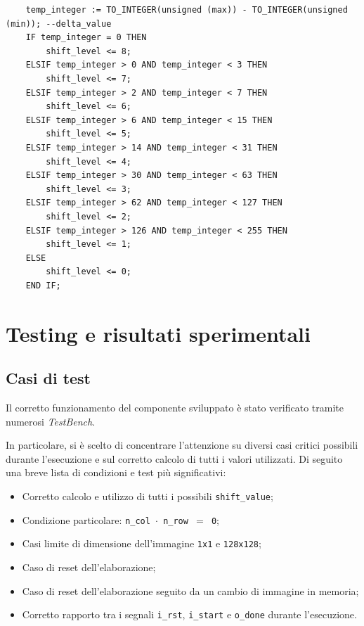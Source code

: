 \documentclass{article}
\begin{document}
\begin{verbatim}
    temp_integer := TO_INTEGER(unsigned (max)) - TO_INTEGER(unsigned (min)); --delta_value
    IF temp_integer = 0 THEN
        shift_level <= 8;
    ELSIF temp_integer > 0 AND temp_integer < 3 THEN
        shift_level <= 7;
    ELSIF temp_integer > 2 AND temp_integer < 7 THEN
        shift_level <= 6;
    ELSIF temp_integer > 6 AND temp_integer < 15 THEN
        shift_level <= 5;
    ELSIF temp_integer > 14 AND temp_integer < 31 THEN
        shift_level <= 4;
    ELSIF temp_integer > 30 AND temp_integer < 63 THEN
        shift_level <= 3;
    ELSIF temp_integer > 62 AND temp_integer < 127 THEN
        shift_level <= 2;
    ELSIF temp_integer > 126 AND temp_integer < 255 THEN
        shift_level <= 1;
    ELSE
        shift_level <= 0;
    END IF;
\end{verbatim}

\vspace{1cm}
\section{Testing e risultati sperimentali} %
\subsection{Casi di test} %
Il corretto funzionamento del componente sviluppato è stato verificato tramite numerosi \emph{TestBench}.\par In particolare, si è scelto di concentrare l’attenzione su diversi casi critici possibili durante l’esecuzione e sul corretto calcolo di tutti i valori utilizzati. Di seguito una breve lista di condizioni e test più significativi:

\begin{itemize}
    \item   Corretto calcolo e utilizzo di tutti i possibili \texttt{shift\_value};
    \item   Condizione particolare: \texttt{n\_col $\cdot$ n\_row $=$ 0}\footnotemark ;
    \item   Casi limite di dimensione dell’immagine \texttt{1x1} e \texttt{128x128};
    \item   Caso di reset dell’elaborazione;
    \item   Caso di reset dell’elaborazione seguito da un cambio di immagine in memoria;
    \item   Corretto rapporto tra i segnali \texttt{i\_rst}, \texttt{i\_start} e \texttt{o\_done} durante   l’esecuzione.
\end{itemize}
\end{document}

